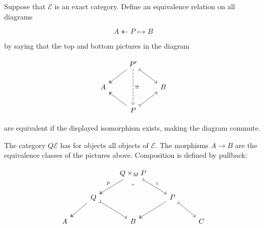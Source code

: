 \documentclass[12pt]{report}
\numberwithin{equation}{section}
\begin{document}
		
		Suppose that \(\mathcal{E}\) is an exact category. Define an equivalence relation on all diagrams
		
		\[
		A \twoheadleftarrow P \rightarrowtail B
		\]
		
		by saying that the top and bottom pictures in the diagram
		
		\[\begin{tikzcd}
			& {P'} \\
			A && B \\
			& P
			\arrow[two heads, from=1-2, to=2-1]
			\arrow[tail, from=1-2, to=2-3]
			\arrow["\cong", dashed, from=1-2, to=3-2]
			\arrow[two heads, from=3-2, to=2-1]
			\arrow[tail, from=3-2, to=2-3]
		\end{tikzcd}\]
		
		are equivalent if the displayed isomorphism exists, making the diagram commute.
		
		The category \( Q\mathcal{E} \) has for objects all objects of \( \mathcal{E} \). The morphisms \( A \to B \) are the equivalence classes of the pictures above. Composition is defined by pullback:
		
	\[\begin{tikzcd}
		&& {Q\times_MP} \\
		& Q && P \\
		A && B && C
		\arrow["p"', two heads, from=1-3, to=2-2]
		\arrow["i", tail, from=1-3, to=2-4]
		\arrow["\lrcorner"{anchor=center, pos=0.125, rotate=-45}, draw=none, from=1-3, to=3-3]
		\arrow[two heads, from=2-2, to=3-1]
		\arrow[tail, from=2-2, to=3-3]
		\arrow[two heads, from=2-4, to=3-3]
		\arrow[tail, from=2-4, to=3-5]
	\end{tikzcd}\]
		
\end{document}
